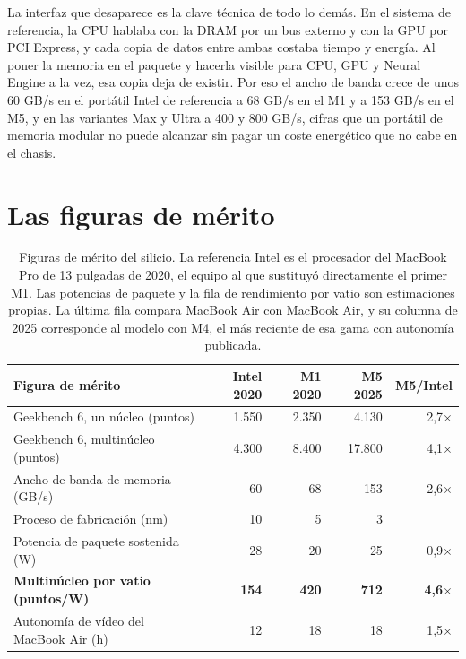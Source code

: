 \documentclass[11pt,letterpaper]{article}
\begin{document}
La interfaz que desaparece es la clave técnica de todo lo demás. En el sistema
de referencia, la CPU hablaba con la DRAM por un bus externo y con la GPU por
PCI Express, y cada copia de datos entre ambas costaba tiempo y energía. Al
poner la memoria en el paquete y hacerla visible para CPU, GPU y Neural Engine
a la vez, esa copia deja de existir. Por eso el ancho de banda crece de unos
60 GB/s en el portátil Intel de referencia a 68 GB/s en el M1 y a 153 GB/s en
el M5, y en las variantes Max y Ultra a 400 y 800 GB/s, cifras que un portátil
de memoria modular no puede alcanzar sin pagar un coste energético que no cabe
en el chasis.

\section{Las figuras de mérito}

\begin{table}[b]
\small
\caption{Figuras de mérito del silicio. La referencia Intel es el procesador
del MacBook Pro de 13 pulgadas de 2020, el equipo al que sustituyó
directamente el primer M1. Las potencias de paquete y la fila de rendimiento por vatio
son estimaciones propias. La última fila compara MacBook Air con MacBook Air,
y su columna de 2025 corresponde al modelo con M4, el más reciente de esa
gama con autonomía publicada.}
\label{cuadro:fom}
\begin{tabularx}{\textwidth}{@{}Xrrrr@{}}
\toprule
\textbf{Figura de mérito} & \textbf{Intel 2020} & \textbf{M1 2020} &
\textbf{M5 2025} & \textbf{M5/Intel} \\
\midrule
Geekbench 6, un núcleo (puntos) & 1.550 & 2.350 & 4.130 & 2,7$\times$ \\
Geekbench 6, multinúcleo (puntos) & 4.300 & 8.400 & 17.800 & 4,1$\times$ \\
Ancho de banda de memoria (GB/s) & 60 & 68 & 153 & 2,6$\times$ \\
Proceso de fabricación (nm) & 10 & 5 & 3 & \\
Potencia de paquete sostenida (W) & 28 & 20 & 25 & 0,9$\times$ \\
\addlinespace[2pt]
\textbf{Multinúcleo por vatio (puntos/W)} & \textbf{154} & \textbf{420} &
\textbf{712} & \textbf{4,6}$\times$ \\
Autonomía de vídeo del MacBook Air (h) & 12 & 18 & 18 & 1,5$\times$ \\
\bottomrule
\end{tabularx}
\end{table}
\end{document}

